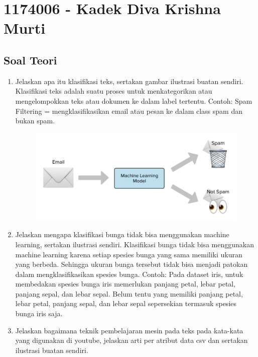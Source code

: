 \section{1174006 - Kadek Diva Krishna Murti}
\subsection{Soal Teori}
\begin{enumerate}
	\item Jelaskan apa itu klasifikasi teks, sertakan gambar ilustrasi buatan sendiri.
	\hfill\break
	Klasifikasi teks adalah suatu proses untuk menkategorikan atau mengelompokkan teks atau dokumen ke dalam label tertentu.
	\hfill\break
	Contoh:
	\hfill\break
	Spam Filtering = mengklasifikasikan email atau pesan ke dalam class spam dan bukan spam.
	\hfill\break
	\begin{figure}[H]
	\centering
		\includegraphics[width=8 cm]{figures/1174006/chapter4/soalteori/1.PNG}
	\end{figure}

	\item Jelaskan mengapa klasifikasi bunga tidak bisa menggunakan machine learning, sertakan ilustrasi sendiri.
	\hfill\break
	Klasifikasi bunga tidak bisa menggunakan machine learning karena setiap spesies bunga yang sama memiliki ukuran yang berbeda. Sehingga ukuran bunga tersebut tidak bisa menjadi patokan dalam mengklasifikasikan spesies bunga.
	\hfill\break
	Contoh:
	\hfill\break
	Pada dataset iris, untuk membedakan spesies bunga iris memerlukan panjang petal, lebar petal, panjang sepal, dan lebar sepal. Belum tentu yang memiliki panjang petal, lebar petal, panjang sepal, dan lebar sepal sepersekian termasuk spesies bunga iris saja.

	\item Jelaskan bagaimana teknik pembelajaran mesin pada teks pada kata-kata yang digunakan di youtube, jelaskan arti per atribut data csv dan sertakan ilustrasi buatan sendiri.
	

\end{enumerate}
